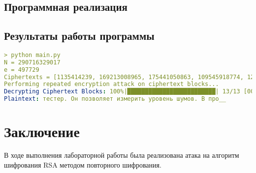 \documentclass[a4paper, 14pt]{report}
\begin{document}
\section*{Программная реализация}
{}





\section*{Результаты работы программы}
{}

\begin{lstlisting}[language=YAML, caption=Вывод в консоль]
> python main.py
N = 290716329017
e = 497729
Ciphertexts = [1135414239, 169213008965, 175441050863, 109545918774, 123669279758, 149542889269, 43068653151, 32806195453, 285151390718, 137668394392, 140567677417, 176736386447, 218957656245]
Performing repeated encryption attack on ciphertext blocks...
Decrypting Ciphertext Blocks: 100%|█████████████████████████| 13/13 [00:01<00:00,  9.29it/s]
Plaintext: тестер. Он позволяет измерить уровень шумов. В про__
\end{lstlisting}
\chapter*{Заключение}
{}
В ходе выполнения лабораторной работы была реализована атака на алгоритм шифрования RSA методом повторного шифрования.
\end{document}
